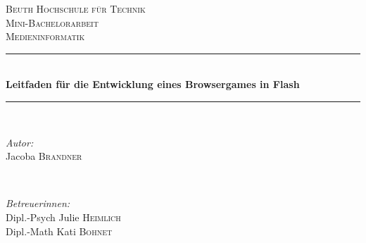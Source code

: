 \begin{titlepage}

\newcommand{\HRule}{\rule{\linewidth}{0.5mm}} %

\center %
 

\textsc{\LARGE Beuth Hochschule f\"ur Technik}\\[1.5cm] %
\textsc{\Large Mini-Bachelorarbeit}\\[0.5cm] %
\textsc{\large Medieninformatik}\\[2.5cm] %


\HRule \\[0.4cm]
{\huge \onehalfsize \bfseries Leitfaden f\"ur die Entwicklung eines Browsergames in Flash}\\[0.4cm] %
\HRule \\[7.5cm]
 

\begin{minipage}{0.4\textwidth}
\begin{flushleft} \large
\emph{Autor:}\\
Jacoba \textsc{Brandner} %
\end{flushleft}
\end{minipage}
~
\begin{minipage}{0.4\textwidth}
\begin{flushright} \large
\emph{Betreuerinnen:} \\
Dipl.-Psych Julie  \textsc{Heimlich} \\%
Dipl.-Math Kati  \textsc{Bohnet} \\
\end{flushright}
\end{minipage}\\[4cm]


\end{titlepage}
